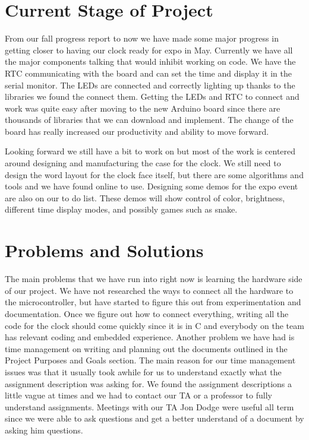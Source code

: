 \documentclass[onecolumn, draftclsnofoot,10pt, compsoc]{IEEEtran}
\begin{document}
\section{Current Stage of Project}
From our fall progress report to now we have made some major progress in getting closer to having our clock ready for expo in May.
Currently we have all the major components talking that would inhibit working on code.
We have the RTC communicating with the board and can set the time and display it in the serial monitor.
The LEDs are connected and correctly lighting up thanks to the libraries we found the connect them.
Getting the LEDs and RTC to connect and work was quite easy after moving to the new Arduino board since there are thousands of libraries that we can download and implement.
The change of the board has really increased our productivity and ability to move forward.

Looking forward we still have a bit to work on but most of the work is centered around designing and manufacturing the case for the clock.
We still need to design the word layout for the clock face itself, but there are some algorithms and tools and we have found online to use.
Designing some demos for the expo event are also on our to do list.
These demos will show control of color, brightness, different time display modes, and possibly games such as snake.

\section{Problems and Solutions}
The main problems that we have run into right now is learning the hardware side of our project.
We have not researched the ways to connect all the hardware to the microcontroller, but have started to figure this out from experimentation and documentation.
Once we figure out how to connect everything, writing all the code for the clock should come quickly since it is in C and everybody on the team has relevant coding and embedded experience.
Another problem we have had is time management on writing and planning out the documents outlined in the Project Purposes and Goals section.
The main reason for our time management issues was that it usually took awhile for us to understand exactly what the assignment description was asking for.
We found the assignment descriptions a little vague at times and we had to contact our TA or a professor to fully understand assignments.
Meetings with our TA Jon Dodge were useful all term since we were able to ask questions and get a better understand of a document by asking him questions.
\end{document}
